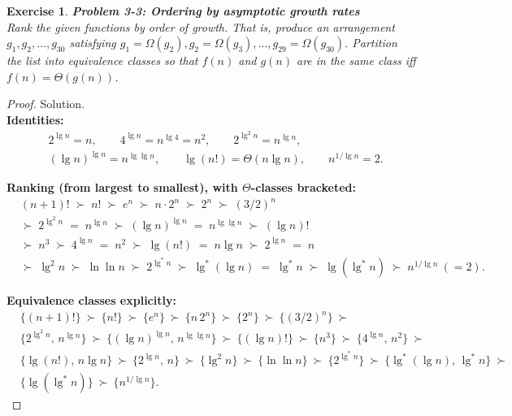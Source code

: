 \documentclass[12pt]{article}
\newtheorem{exercise}[theorem]{Exercise}
\theoremstyle{definition}
\begin{document}
\newpage

\begin{exercise}
\noindent
\textbf{Problem 3-3: Ordering by asymptotic growth rates} \\
Rank the given functions by order of growth. That is, produce an arrangement
$g_1,g_2,\dots,g_{30}$ satisfying $g_1=\Omega(g_2),g_2=\Omega(g_3),\dots,g_{29}=\Omega(g_{30})$.
Partition the list into equivalence classes so that $f(n)$ and $g(n)$ are in the same
class iff $f(n)=\Theta(g(n))$.
\end{exercise}

\begin{proof}
Solution. \\

\noindent\textbf{Identities:}
\[
\begin{aligned}
&2^{\lg n}=n,\qquad 4^{\lg n}=n^{\lg 4}=n^2,\qquad
2^{\lg^2 n}=n^{\lg n},\\
&(\lg n)^{\lg n}=n^{\lg\lg n},\qquad
\lg(n!)=\Theta(n\lg n),\qquad
n^{1/\lg n}=2.
\end{aligned}
\]

\noindent\textbf{Ranking (from largest to smallest), with $\Theta$-classes bracketed:}
\[
\begin{aligned}
&\boxed{(n+1)!}\; \succ\; \boxed{n!}\; \succ\;
\boxed{e^{n}}\; \succ\; \boxed{n\cdot 2^{n}}\; \succ\; \boxed{2^{n}}\; \succ\; \boxed{(3/2)^{n}} \\[2pt]
&\succ\; \boxed{2^{\lg^{2} n}}\;=\;\boxed{n^{\lg n}}
\;\succ\;
\boxed{(\lg n)^{\lg n}}\;=\;\boxed{n^{\lg\lg n}}
\;\succ\;
\boxed{(\lg n)!} \\[2pt]
&\succ\; \boxed{n^3}
\;\succ\;
\boxed{4^{\lg n}}\;=\;\boxed{n^2}
\;\succ\;
\boxed{\lg(n!)}\;=\;\boxed{n\lg n}
\;\succ\;
\boxed{2^{\lg n}}\;=\;\boxed{n} \\[2pt]
&\succ\; \boxed{\lg^{2} n}
\;\succ\;
\boxed{\ln\ln n}
\;\succ\;
\boxed{2^{\lg^{*}n}}
\;\succ\;
\boxed{\lg^{*}(\lg n)}\;=\;\boxed{\lg^{*} n}
\;\succ\;
\boxed{\lg(\lg^{*} n)}
\;\succ\;
\boxed{n^{1/\lg n}}~(=2).
\end{aligned}
\]

\noindent\textbf{Equivalence classes explicitly:}
\[
\begin{aligned}
&\{(n+1)!\}\ \succ\
\{n!\}\ \succ\
\{e^n\}\ \succ\
\{n\,2^n\}\ \succ\
\{2^n\}\ \succ\
\{(3/2)^n\}\ \succ\\
&\{2^{\lg^2 n},\,n^{\lg n}\}\ \succ\
\{(\lg n)^{\lg n},\,n^{\lg\lg n}\}\ \succ\
\{(\lg n)!\}\ \succ\
\{n^3\}\ \succ\
\{4^{\lg n},\,n^2\}\ \succ\\
&\{\lg(n!),\,n\lg n\}\ \succ\
\{2^{\lg n},\,n\}\ \succ\
\{\lg^2 n\}\ \succ\
\{\ln\ln n\}\ \succ\
\{2^{\lg^* n}\}\ \succ\
\{\lg^*(\lg n),\,\lg^* n\}\ \succ\\
&\{\lg(\lg^* n)\}\ \succ\
\{n^{1/\lg n}\}.
\end{aligned}
\]


\end{proof}
\end{document}
